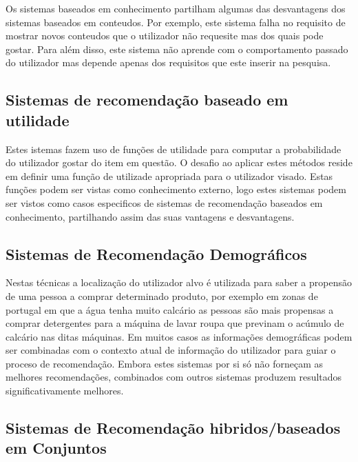 Os sistemas baseados em conhecimento partilham algumas das desvantagens dos sistemas baseados em conteudos. 
Por exemplo, este sistema falha no requisito de mostrar novos conteudos que o utilizador não requesite mas dos quais pode gostar.
Para além disso, este sistema não aprende com o comportamento passado do utilizador mas depende apenas dos requisitos que este inserir na pesquisa.


\subsection{Sistemas de recomendação baseado em utilidade}

Estes istemas fazem uso de funções de utilidade para computar a probabilidade do utilizador gostar do item em questão. O desafio ao aplicar estes métodos reside em definir uma função de utilizade apropriada para o utilizador visado. Estas funções podem ser vistas como conhecimento externo, logo estes sistemas podem ser vistos como casos especificos de sistemas de recomendação baseados em conhecimento, partilhando assim das suas vantagens e desvantagens.

 
\subsection{Sistemas de Recomendação Demográficos}

 Nestas técnicas a localização do utilizador alvo é utilizada para saber a propensão de uma pessoa a comprar determinado produto, por exemplo em zonas de portugal em que a água tenha muito calcário as pessoas são mais propensas a comprar detergentes para a máquina de lavar roupa que previnam o acúmulo de calcário nas ditas máquinas.
  Em muitos casos as informações demográficas podem ser combinadas com o contexto atual de informação do utilizador para guiar o proceso de recomendação.
 Embora estes sistemas por si só não forneçam as melhores recomendações, combinados com outros sistemas produzem resultados significativamente melhores.

\subsection{Sistemas de Recomendação hibridos/baseados em Conjuntos}

